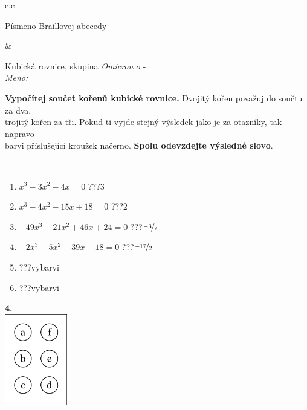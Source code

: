 \documentclass[10pt]{report}
\newcommand\omicron{o}
\begin{document}
\begin{tabular}{c:c}
\begin{minipage}[c][104.5mm][t]{0.5\linewidth}
\begin{center}
\begin{minipage}{0.20\linewidth}
\begin{center}
{\small Písmeno Braillovej abecedy}
\end{center}
\end{minipage}
\end{center}
\end{minipage}
&
\begin{minipage}[c][104.5mm][t]{0.5\linewidth}
\begin{center}
\vspace{7mm}
{\huge Kubická rovnice, skupina \textit{Omicron $\omicron$} -}\\[5mm]
\textit{Meno:}\phantom{xxxxxxxxxxxxxxxxxxxxxxxxxxxxxxxxxxxxxxxxxxxxxxxxxxxxxxxxxxxxxxxxx}\\[5mm]
\begin{minipage}{0.95\linewidth}
\textbf{Vypočítej součet kořenů kubické rovnice.} Dvojitý kořen považuj do součtu za dva,\\trojitý kořen za tři. Pokud ti vyjde stejný výsledek jako je za otazníky, tak napravo\\barvi příslušející kroužek načerno. \textbf{Spolu odevzdejte výsledné slovo}.
\end{minipage}
\\[1mm]
\begin{minipage}{0.79\linewidth}
\begin{center}
\begin{varwidth}{\linewidth}
\begin{enumerate}
\Large
\item $x^3-3x^2-4x=0$\quad \dotfill\; ???\;\dotfill \quad $3$
\item $x^3-4x^2-15x+18=0$\quad \dotfill\; ???\;\dotfill \quad $2$
\item $-49x^3-21x^2+46x+24=0$\quad \dotfill\; ???\;\dotfill \quad $\nicefrac{-3}{7}$
\item $-2x^3-5x^2+39x-18=0$\quad \dotfill\; ???\;\dotfill \quad $\nicefrac{-17}{2}$
\item \quad \dotfill\; ???\;\dotfill \quad vybarvi
\item \quad \dotfill\; ???\;\dotfill \quad vybarvi
\end{enumerate}
\end{varwidth}
\end{center}
\end{minipage}
\begin{minipage}{0.20\linewidth}
\begin{center}
{\Huge\bfseries 4.} \\[2mm]
\includegraphics[height=40mm]{../images/braille.png}

\end{center}
\end{minipage}
\end{center}
\end{minipage}
\end{tabular}
\end{document}

